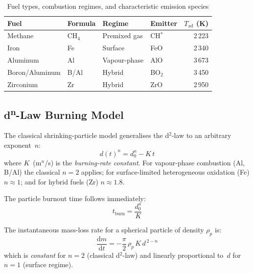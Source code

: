 \documentclass[11pt,a4paper]{article}
\begin{document}
\begin{table}[h]
\centering
\caption{Fuel types, combustion regimes, and characteristic emission species}
\begin{tabular}{@{}llllr@{}}
\toprule
Fuel & Formula & Regime & Emitter & $T_{\mathrm{ad}}$ (K) \\
\midrule
Methane        & CH$_4$  & Premixed gas  & CH$^*$  & 2\,223 \\
Iron           & Fe      & Surface       & FeO     & 2\,340 \\
Aluminum       & Al      & Vapour-phase  & AlO     & 3\,673 \\
Boron/Aluminum & B/Al    & Hybrid        & BO$_2$  & 3\,450 \\
Zirconium      & Zr      & Hybrid        & ZrO     & 2\,950 \\
\bottomrule
\end{tabular}
\end{table}

\subsection{d\textsuperscript{n}-Law Burning Model}

The classical shrinking-particle model generalises the d$^2$-law to an
arbitrary exponent~$n$:
\begin{equation}\label{eq:dn_law}
  d(t)^{n} = d_0^{n} - K\,t
\end{equation}
where $K$~(m$^n$/s) is the \emph{burning-rate constant}.  For
vapour-phase combustion (Al, B/Al) the classical $n=2$ applies; for
surface-limited heterogeneous oxidation (Fe) $n\approx 1$; and for hybrid
fuels (Zr) $n\approx 1.8$.

The particle burnout time follows immediately:
\begin{equation}\label{eq:t_burn}
  t_{\mathrm{burn}} = \frac{d_0^{n}}{K}
\end{equation}

The instantaneous mass-loss rate for a spherical particle of density
$\rho_p$ is:
\begin{equation}\label{eq:dm_dt}
  \frac{\mathrm{d}m}{\mathrm{d}t}
    = -\frac{\pi}{2}\,\rho_p\,K\,d^{\,2-n}
\end{equation}
which is \emph{constant} for $n=2$ (classical d$^2$-law) and linearly
proportional to~$d$ for $n=1$ (surface regime).
\end{document}
